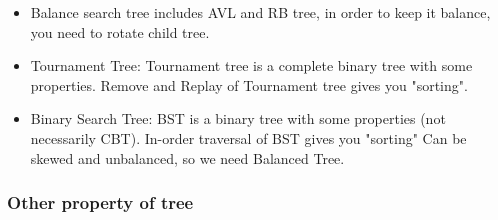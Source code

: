 \documentclass[a4paper,11pt,twoside]{book}
\begin{document}
\begin{itemize}
\item Balance search tree includes AVL and RB tree, in order to keep it balance, you need to rotate child tree. 

\item Tournament Tree: Tournament tree is a complete binary tree with some properties. Remove and  Replay of Tournament tree gives you "sorting". 

\item Binary Search Tree: BST is a binary tree with some properties (not necessarily CBT). In-order traversal of BST gives you "sorting" Can be skewed and unbalanced, so we need Balanced Tree.

\end{itemize}

\subsubsection{Other property of tree}
\end{document}
